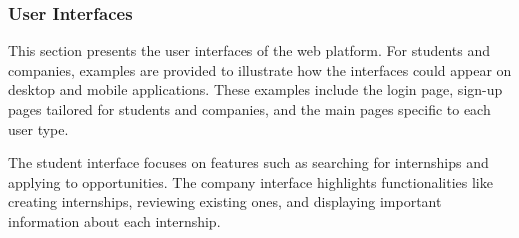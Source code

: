 \subsubsection{User Interfaces}

This section presents the user interfaces of the web platform. For students and companies, examples are provided to illustrate how the interfaces could appear on desktop and mobile applications. These examples include the login page, sign-up pages tailored for students and companies, and the main pages specific to each user type.

The student interface focuses on features such as searching for internships and applying to opportunities. The company interface highlights functionalities like creating internships, reviewing existing ones, and displaying important information about each internship.




